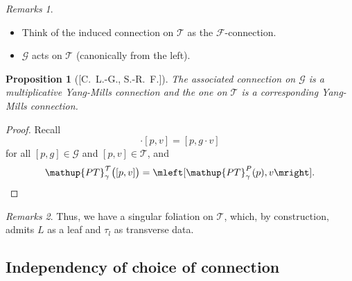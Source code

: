 \documentclass[hyperref={pdfpagelabels=false}]{beamer}
\def\bes{\begin{equation*}}
\def\ees{\end{equation*}}
\theoremstyle{plain}
\newtheorem{proposition}[theorem]{Proposition}
\theoremstyle{remark}
\newtheorem*{remark}{Remarks}
\begin{document}
{\begin{frame}
\begin{remark}
\begin{itemize}
	\item Think of the induced connection on $\mathcal{T}$ as the $\mathcal{F}$-connection.
	\item $\mathcal{G}$ acts on $\mathcal{T}$ (canonically from the left).
\end{itemize}
\end{remark}

\end{frame}

\begin{frame}
\begin{proposition}[{[C.\ L.-G., S.-R.\ F.]}]
The associated connection on $\mathcal{G}$ is a multiplicative Yang-Mills connection and the one on $\mathcal{T}$ is a corresponding Yang-Mills connection.
\end{proposition}

\begin{proof}
Recall
\bes
[p, g] \cdot [p, v]
=
[p, g \cdot v]
\ees
for all $[p, g] \in \mathcal{G}$ and $[p, v] \in \mathcal{T}$, and
\bes
\mathup{PT}^{\mathcal{T}}_\gamma\bigl( [p, v] \bigr)
=
\mleft[ \mathup{PT}^{P}_\gamma(p), v \mright].
\ees
\end{proof}

\pause

\begin{remark}
Thus, we have a singular foliation on $\mathcal{T}$, which, by construction, admits $L$ as a leaf and $\tau_l$ as transverse data.
\end{remark}
\end{frame}

{

\subsection{Independency of choice of connection}


}}
\end{document}
